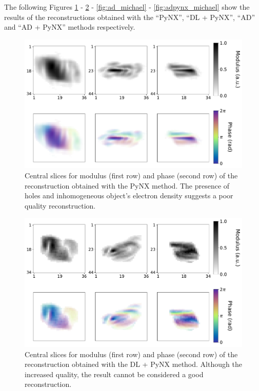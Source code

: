 The following Figures \ref{fig:pynx_michael} - \ref{fig:dl_pynx_michael} - \ref{fig:ad_michael} - \ref{fig:adpynx_michael} show the results 
of the reconstructions obtained with the ``PyNX'', ``DL + PyNX'', ``AD'' and ``AD + PyNX'' methods respectively. 


\begin{figure}[H]
  \centering
  \includegraphics[width=\textwidth]{figures/AD/pynx_michael.pdf}
  \caption{Central slices for modulus (first row) and phase (second row) of the reconstruction obtained with the PyNX method.
           The presence of holes and inhomogeneous object's electron density suggests a poor quality reconstruction.}
  \label{fig:pynx_michael}
\end{figure}

\begin{figure}[H]
  \centering
  \includegraphics[width=\textwidth]{figures/AD/dl_pynx_michael.pdf}
  \caption{Central slices for modulus (first row) and phase (second row) of the reconstruction obtained with the DL + PyNX 
  method. Although the increased quality, the result cannot be considered a good reconstruction.}
  \label{fig:dl_pynx_michael}
\end{figure}

